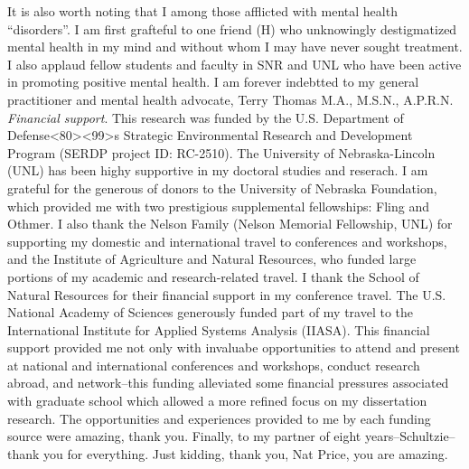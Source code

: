 \documentclass[12pt,twoside,openany]{reedthesis}
\begin{document}
It is also worth noting that I among those afflicted with mental health ``disorders''. I am first grafteful to one friend (H) who unknowingly destigmatized mental health in my mind and without whom I may have never sought treatment. I also applaud fellow students and faculty in SNR and UNL who have been active in promoting positive mental health. I am forever indebtted to my general practitioner and mental health advocate, Terry Thomas M.A., M.S.N., A.P.R.N.
\emph{Financial support}. This research was funded by the U.S. Department of Defense\textless80\textgreater\textless99\textgreater s Strategic Environmental Research and Development Program (SERDP project ID: RC-2510). The University of Nebraska-Lincoln (UNL) has been highy supportive in my doctoral studies and reserach. I am grateful for the generous of donors to the University of Nebraska Foundation, which provided me with two prestigious supplemental fellowships: Fling and Othmer. I also thank the Nelson Family (Nelson Memorial Fellowship, UNL) for supporting my domestic and international travel to conferences and workshops, and the Institute of Agriculture and Natural Resources, who funded large portions of my academic and research-related travel. I thank the School of Natural Resources for their financial support in my conference travel. The U.S. National Academy of Sciences generously funded part of my travel to the International Institute for Applied Systems Analysis (IIASA). This financial support provided me not only with invaluabe opportunities to attend and present at national and international conferences and workshops, conduct research abroad, and network--this funding alleviated some financial pressures associated with graduate school which allowed a more refined focus on my dissertation research. The opportunities and experiences provided to me by each funding source were amazing, thank you.
Finally, to my partner of eight years--Schultzie--thank you for everything. Just kidding, thank you, Nat Price, you are amazing.
%

  \hypersetup{linkcolor=black}
  \setcounter{tocdepth}{2}
  \tableofcontents

  \listoftables

  \listoffigures


%
\mainmatter %
\pagestyle{fancyplain} %
\doublespacing{} %
\end{document}
